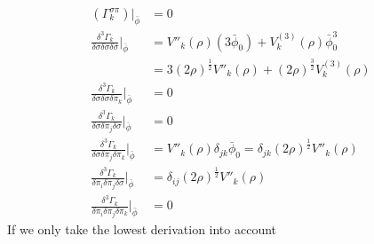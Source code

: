 \documentclass[UTF8]{article}
\begin{document}
\begin{equation}
\begin{split}
(\Gamma^{\sigma\pi}_k)\big|_{\bar{\phi}}&=0\\
\frac{\delta^3\Gamma_k}{\delta\sigma\delta\sigma\delta\sigma}\bigg|_{\bar{\phi}}&=V''_k(\rho)(3\bar{\phi}_0)+V^{(3)}_{k}(\rho)\bar{\phi}_0^3\\
&=3(2\rho)^{\frac{1}{2}}V''_k(\rho)+(2\rho)^{\frac{3}{2}}V^{(3)}_{k}(\rho)\\
\frac{\delta^3\Gamma_k}{\delta\sigma\delta\sigma\delta\pi_k}\bigg|_{\bar{\phi}}&=0\\
\frac{\delta^3\Gamma_k}{\delta\sigma\delta\pi_j\delta\sigma}\bigg|_{\bar{\phi}}&=0\\
\frac{\delta^3\Gamma_k}{\delta\sigma\delta\pi_j\delta\pi_k}\bigg|_{\bar{\phi}}&=V''_k(\rho)\delta_{jk}\bar{\phi}_0=\delta_{jk}(2\rho)^{\frac{1}{2}}V''_k(\rho)\\
\frac{\delta^3\Gamma_k}{\delta\pi_i\delta\pi_j\delta\sigma}\bigg|_{\bar{\phi}}&=\delta_{ij}(2\rho)^{\frac{1}{2}}V''_k(\rho)\\
\frac{\delta^3\Gamma_k}{\delta\pi_i\delta\pi_j\delta\pi_k}\bigg|_{\bar{\phi}}&=0
\end{split}
\end{equation}
If we only take the lowest derivation into account
\end{document}
